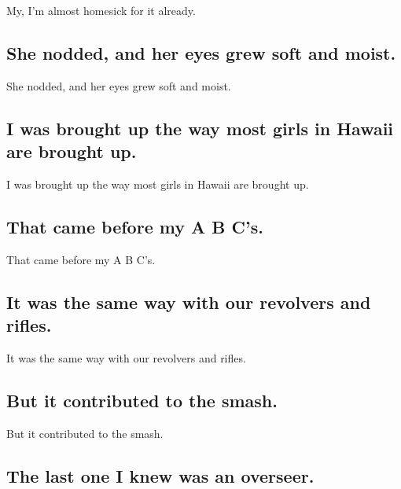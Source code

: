 \documentclass[]{article}
\begin{document}
My, I'm almost homesick for it already.

\hypertarget{she-nodded-and-her-eyes-grew-soft-and-moist.}{%
\subsection{She nodded, and her eyes grew soft and
moist.}\label{she-nodded-and-her-eyes-grew-soft-and-moist.}}

She nodded, and her eyes grew soft and moist.

\hypertarget{i-was-brought-up-the-way-most-girls-in-hawaii-are-brought-up.}{%
\subsection{I was brought up the way most girls in Hawaii are brought
up.}\label{i-was-brought-up-the-way-most-girls-in-hawaii-are-brought-up.}}

I was brought up the way most girls in Hawaii are brought up.

\hypertarget{that-came-before-my-a-b-cs.}{%
\subsection{That came before my A B
C's.}\label{that-came-before-my-a-b-cs.}}

That came before my A B C's.

\hypertarget{it-was-the-same-way-with-our-revolvers-and-rifles.}{%
\subsection{It was the same way with our revolvers and
rifles.}\label{it-was-the-same-way-with-our-revolvers-and-rifles.}}

It was the same way with our revolvers and rifles.

\hypertarget{but-it-contributed-to-the-smash.}{%
\subsection{But it contributed to the
smash.}\label{but-it-contributed-to-the-smash.}}

But it contributed to the smash.

\hypertarget{the-last-one-i-knew-was-an-overseer.}{%
\subsection{The last one I knew was an
overseer.}\label{the-last-one-i-knew-was-an-overseer.}}
\end{document}
